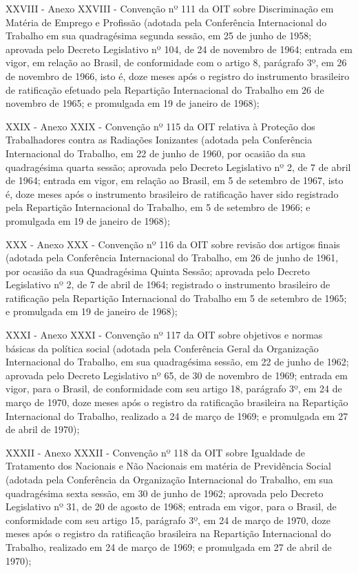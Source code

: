\documentclass[
]{book}
\begin{document}
XXVIII - Anexo XXVIII - Convenção nº 111 da OIT sobre Discriminação em Matéria de Emprego e Profissão (adotada pela Conferência Internacional do Trabalho em sua quadragésima segunda sessão, em 25 de junho de 1958; aprovada pelo Decreto Legislativo nº 104, de 24 de novembro de 1964; entrada em vigor, em relação ao Brasil, de conformidade com o artigo 8, parágrafo 3º, em 26 de novembro de 1966, isto é, doze meses após o registro do instrumento brasileiro de ratificação efetuado pela Repartição Internacional do Trabalho em 26 de novembro de 1965; e promulgada em 19 de janeiro de 1968);

XXIX - Anexo XXIX - Convenção nº 115 da OIT relativa à Proteção dos Trabalhadores contra as Radiações Ionizantes (adotada pela Conferência Internacional do Trabalho, em 22 de junho de 1960, por ocasião da sua quadragésima quarta sessão; aprovada pelo Decreto Legislativo nº 2, de 7 de abril de 1964; entrada em vigor, em relação ao Brasil, em 5 de setembro de 1967, isto é, doze meses após o instrumento brasileiro de ratificação haver sido registrado pela Repartição Internacional do Trabalho, em 5 de setembro de 1966; e promulgada em 19 de janeiro de 1968);

XXX - Anexo XXX - Convenção nº 116 da OIT sobre revisão dos artigos finais (adotada pela Conferência Internacional do Trabalho, em 26 de junho de 1961, por ocasião da sua Quadragésima Quinta Sessão; aprovada pelo Decreto Legislativo nº 2, de 7 de abril de 1964; registrado o instrumento brasileiro de ratificação pela Repartição Internacional do Trabalho em 5 de setembro de 1965; e promulgada em 19 de janeiro de 1968);

XXXI - Anexo XXXI - Convenção nº 117 da OIT sobre objetivos e normas básicas da política social (adotada pela Conferência Geral da Organização Internacional do Trabalho, em sua quadragésima sessão, em 22 de junho de 1962; aprovada pelo Decreto Legislativo nº 65, de 30 de novembro de 1969; entrada em vigor, para o Brasil, de conformidade com seu artigo 18, parágrafo 3º, em 24 de março de 1970, doze meses após o registro da ratificação brasileira na Repartição Internacional do Trabalho, realizado a 24 de março de 1969; e promulgada em 27 de abril de 1970);

XXXII - Anexo XXXII - Convenção nº 118 da OIT sobre Igualdade de Tratamento dos Nacionais e Não Nacionais em matéria de Previdência Social (adotada pela Conferência da Organização Internacional do Trabalho, em sua quadragésima sexta sessão, em 30 de junho de 1962; aprovada pelo Decreto Legislativo nº 31, de 20 de agosto de 1968; entrada em vigor, para o Brasil, de conformidade com seu artigo 15, parágrafo 3º, em 24 de março de 1970, doze meses após o registro da ratificação brasileira na Repartição Internacional do Trabalho, realizado em 24 de março de 1969; e promulgada em 27 de abril de 1970);
\end{document}
